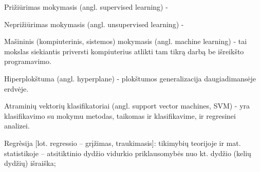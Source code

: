 Prižiūrimas mokymasis (angl. supervised learning) - %

Neprižiūrimas mokymasis (angl. unsupervised learning) - %

Mašininis\cite{mamcenko08} (kompiuterinis, sistemos\cite{martisiute08})
mokymasis (angl. machine learning) - tai mokslas siekiantis priversti
kompiuterius atlikti tam tikrą darbą be išreikšto programavimo.
\begin{comment}
Machine learning is the science of getting computers to act without being
explicitly programmed.
\end{comment}

Hiperplokštuma (angl. hyperplane) - plokštumos generalizacija daugiadimansėje
erdvėje.

Atraminių vektorių klasifikatoriai (angl. support vector machines, SVM) - yra
klasifikavimo su mokymu metodas, taikomas ir klasifikavime, ir regresinei
analizei.\cite{bernataviciene08}

Regrèsija [lot. regressio – grįžimas, traukimasis]: tikimybių teorijoje ir mat.
statistikoje – atsitiktinio dydžio vidurkio priklausomybės nuo kt. dydžio (kelių
dydžių) išraiška;\cite{tzz2010}
